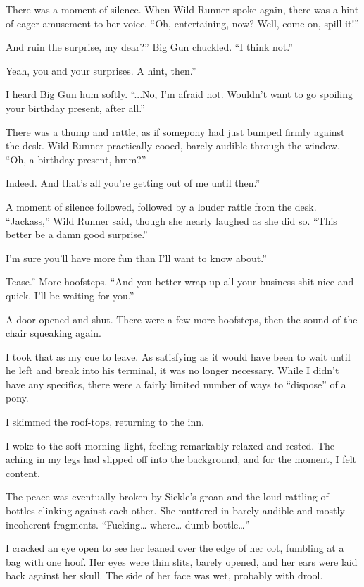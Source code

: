 There was a moment of silence. When Wild Runner spoke again, there was a hint of eager amusement to her voice. “Oh, entertaining, now? Well, come on, spill it!”

\leavevmode{}And ruin the surprise, my dear?” Big Gun chuckled. “I think not.”

\leavevmode{}Yeah, you and your surprises. A hint, then.”

I heard Big Gun hum softly. “...No, I’m afraid not. Wouldn’t want to go spoiling your birthday present, after all.”

There was a thump and rattle, as if somepony had just bumped firmly against the desk. Wild Runner practically cooed, barely audible through the window. “Oh, a birthday present, hmm?”

\leavevmode{}Indeed. And that’s all you’re getting out of me until then.”

A moment of silence followed, followed by a louder rattle from the desk. “Jackass,” Wild Runner said, though she nearly laughed as she did so. “This better be a damn good surprise.”

\leavevmode{}I’m sure you’ll have more fun than I’ll want to know about.”

\leavevmode{}Tease.” More hoofsteps. “And you better wrap up all your business shit nice and quick. I’ll be waiting for you.”

A door opened and shut. There were a few more hoofsteps, then the sound of the chair squeaking again.

I took that as my cue to leave. As satisfying as it would have been to wait until he left and break into his terminal, it was no longer necessary. While I didn’t have any specifics, there were a fairly limited number of ways to “dispose” of a pony.

I skimmed the roof-tops, returning to the inn.

{\br}%
I woke to the soft morning light, feeling remarkably relaxed and rested. The aching in my legs had slipped off into the background, and for the moment, I felt content.

The peace was eventually broken by Sickle’s groan and the loud rattling of bottles clinking against each other. She muttered in barely audible and mostly incoherent fragments. “Fucking… where… dumb bottle…”

I cracked an eye open to see her leaned over the edge of her cot, fumbling at a bag with one hoof. Her eyes were thin slits, barely opened, and her ears were laid back against her skull. The side of her face was wet, probably with drool.

